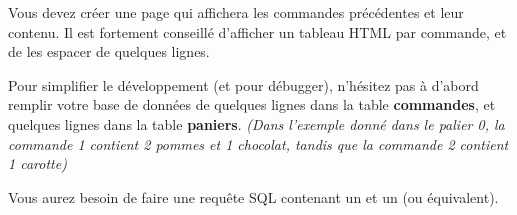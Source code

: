 

\vspace*{0.7cm}

\noindent {}

\bigskip

\noindent Vous devez créer une page  qui affichera les commandes précédentes et leur contenu.
Il est fortement conseillé d'afficher un tableau HTML par commande, et de les espacer de quelques lignes.

\medskip

\noindent Pour simplifier le développement (et pour débugger), n'hésitez pas à d'abord remplir votre base de données de quelques lignes dans la table \textbf{commandes}, et quelques lignes dans la table \textbf{paniers}.
\textit{(Dans l'exemple donné dans le palier 0, la commande 1 contient 2 pommes et 1 chocolat, tandis que la commande 2 contient 1 carotte)}

\medskip

\noindent Vous aurez besoin de faire une requête SQL contenant un  et un  (ou équivalent).
